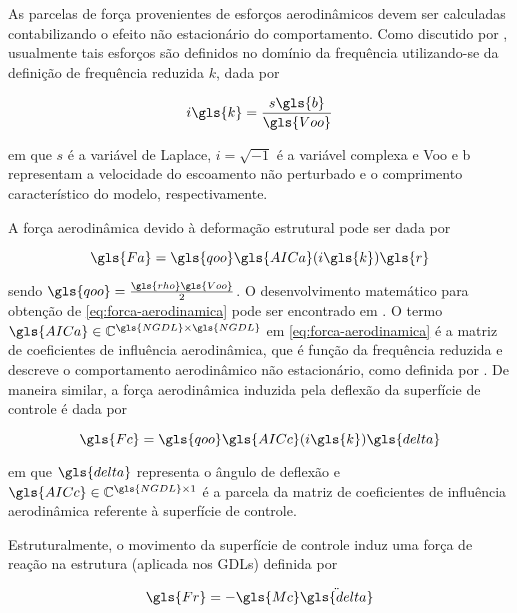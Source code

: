 As parcelas de força provenientes de esforços aerodinâmicos devem ser calculadas contabilizando o efeito não estacionário do comportamento. Como discutido por \textcite{book:Wright-Cooper}, usualmente tais esforços são definidos no domínio da frequência utilizando-se da definição de frequência reduzida $k$, dada por

\begin{equation}\label{eq:Frequencia-reduzida}
    i\gls{k} = \frac{s\gls{b}}{\gls{Voo}}
\end{equation}

\noindent em que $s$ é a variável de Laplace, $i = \sqrt{-1}$ é a variável complexa e \gls{Voo} e \gls{b} representam a velocidade do escoamento não perturbado e o comprimento característico do modelo, respectivamente.

A força aerodinâmica devido à deformação estrutural pode ser dada por

\begin{equation} \label{eq:forca-aerodinamica}
    \gls{Fa} = \gls{qoo}\gls{AICa}(i\gls{k})\gls{r}
\end{equation}

\noindent sendo $\gls{qoo}=\frac{\gls{rho} \gls{Voo}}{2}$. O desenvolvimento matemático para obtenção de \eqref{eq:forca-aerodinamica} pode ser encontrado em \textcite{ZAERO-Theoretical-Manual:2017}. O termo $\gls{AICa} \in \mathbb{C}^{\gls{NGDL} \times \gls{NGDL}}$ em \eqref{eq:forca-aerodinamica} é a matriz de coeficientes de influência aerodinâmica, que é função da frequência reduzida e descreve o comportamento aerodinâmico não estacionário, como definida por \textcite{book:Wright-Cooper}. De maneira similar, a força aerodinâmica induzida pela deflexão da superfície de controle é dada por

\begin{equation} \label{eq:forca-superficie-controle}
    \gls{Fc} = \gls{qoo}\gls{AICc}(i\gls{k})\gls{delta}
\end{equation}

\noindent em que $\gls{delta}$ representa o ângulo de deflexão e $\gls{AICc} \in \mathbb{C}^{\gls{NGDL} \times 1}$ é a parcela da matriz de coeficientes de influência aerodinâmica referente à superfície de controle.

Estruturalmente, o movimento da superfície de controle induz uma força de reação na estrutura (aplicada nos \gls{GDL}s) definida por

\begin{equation} \label{eq:forca-reacao-superficie-controle}
    \gls{Fr} = -\gls{Mc}\ddot{\gls{delta}}
\end{equation}

